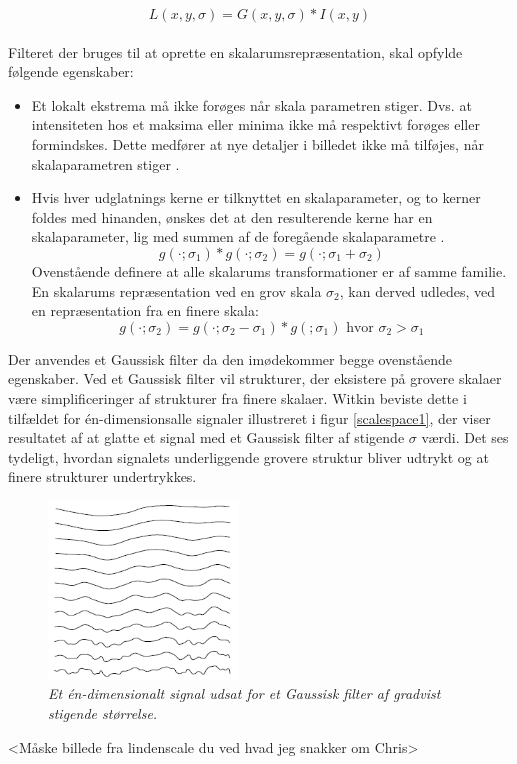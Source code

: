 \begin{equation}
L(x,y,\sigma) = G(x,y,\sigma)\ast I(x,y)
\label{scalespace1}
\end{equation}
\\
Filteret der bruges til at oprette en skalarumsrepræsentation, skal opfylde følgende egenskaber:
\begin{itemize}
\item{Et lokalt ekstrema må ikke forøges når skala parametren stiger. Dvs. at intensiteten hos et maksima eller minima ikke må respektivt forøges eller formindskes. Dette medfører at nye detaljer i billedet ikke må tilføjes, når skalaparametren stiger \cite{lindkth}.}
\item{Hvis hver udglatnings kerne er tilknyttet en skalaparameter, og to kerner foldes med hinanden, ønskes det at den resulterende kerne har en skalaparameter, lig med summen af de foregående skalaparametre \cite{springer}.
\begin{equation}
g(\cdot;\sigma_1) \ast g(\cdot;\sigma_2)=g(\cdot;\sigma_1+\sigma_2)
\label{semi}
\end{equation}
Ovenstående definere at alle skalarums transformationer er af samme familie. En skalarums repræsentation ved en grov skala $\sigma_2$, kan derved udledes, ved en repræsentation fra en finere skala:
\begin{equation}
g(\cdot;\sigma_2) = g(\cdot;\sigma_2-\sigma_1)\ast g(;\sigma_1)\text{     hvor     }\sigma_2>\sigma_1
\end{equation}}
\end{itemize}
Der anvendes et Gaussisk filter da den imødekommer begge ovenstående egenskaber. Ved et Gaussisk filter vil strukturer, der eksistere på grovere skalaer være simplificeringer af strukturer fra finere skalaer. Witkin \cite{witkins} beviste dette i tilfældet for én-dimensionsalle signaler illustreret i figur \ref{scalespace1}, der viser resultatet af at glatte et signal med et Gaussisk filter af stigende $\sigma$ værdi. Det ses tydeligt, hvordan signalets underliggende grovere struktur bliver udtrykt og at finere strukturer undertrykkes.
\begin{figure}[H]
    \centering
    \includegraphics[width=0.45\textwidth]{fig/33.png}
     \vspace{-1em}
    \begin{center}    
       \caption{{\footnotesize \textit{Et én-dimensionalt signal udsat for et Gaussisk filter af gradvist stigende størrelse.}}}
    \label{fig:scalereps}
     \end{center}
     \vspace{-2.5em}
  \end{figure} \noindent
<Måske billede fra lindenscale du ved hvad jeg snakker om Chris>
